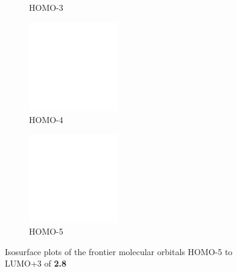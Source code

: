 \begin{figure}[!ht]
\begin{subfigure}[b]{0.31\textwidth}
  \caption{HOMO-3}
 \end{subfigure}
 \begin{subfigure}[b]{0.31\textwidth}
  \includegraphics[clip=true, width=\textwidth, height=39mm, keepaspectratio]{images/mos/8h-4.eps}
  \caption{HOMO-4}
 \end{subfigure}
 \begin{subfigure}[b]{0.31\textwidth}
  \includegraphics[clip=true, width=\textwidth, height=39mm, keepaspectratio]{images/mos/8h-5.eps}
  \caption{HOMO-5}
 \end{subfigure}
\caption[Molecular orbitals HOMO-5 to LUMO+3 of \textbf{2.8}]{Isosurface plots of the frontier molecular orbitals HOMO-5 to LUMO+3 of \textbf{2.8}}
\label{fig.mo28}
\end{figure}
